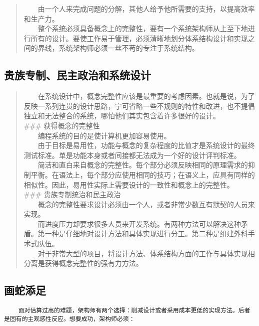 \documentclass[11pt]{article}
\begin{document}
\begin{quote}
  由一个人来完成问题的分解，其他人给予他所需要的支持，以提高效率和生产力。\\
  整个系统必须具备概念上的完整性，要有一个系统架构师从上至下地进行所有的设计。要使工作易于管理，必须清晰地划分体系结构设计和实现之间的界线，系统架构师必须一丝不苟的专注于系统结构。
\end{quote}

\hypertarget{ux8d35ux65cfux4e13ux5236ux6c11ux4e3bux653fux6cbbux548cux7cfbux7edfux8bbeux8ba1}{%
\subsection{贵族专制、民主政治和系统设计}\label{ux8d35ux65cfux4e13ux5236ux6c11ux4e3bux653fux6cbbux548cux7cfbux7edfux8bbeux8ba1}}

\begin{quote}
  在系统设计中，概念完整性应该是最重要的考虑因素。也就是说，为了反映一系列连贯的设计思路，宁可省略一些不规则的特性和改进，也不提倡独立和无法整合的系统，哪怕他们其实包含着许多很好的设计。\\
\#\#\# 获得概念的完整性\\
  编程系统的目的是使计算机更加容易使用。\\
  由于目标是易用性，功能与概念的复杂程度的比值才是系统设计的最终测试标准。单是功能本身或者间接都无法成为一个好的设计评判标准。\\
  简洁和直白来自概念的完整性。每个部分必须反映相同的原理需求的抑制平衡。在语法上，每个部分应使用相同的技巧；在语义上，应具有同样的相似性。因此，易用性实际上需要设计的一致性和概念上的完整性。\\
\#\#\# 贵族专制统治和民主政治\\
  概念的完整性要求设计必须由一个人，或者非常少数互有默契的人员来实现。\\
  而进度压力却要求很多人员来开发系统。有两种方法可以解决这种矛盾。第一种是仔细地对设计方法和具体实现进行分工。第二种是组建外科手术式队伍。\\
  对于非常大型的项目，将设计方法、体系结构方面的工作与具体实现相分离是获得概念完整性的强有力方法。
\end{quote}

\hypertarget{ux753bux86c7ux6dfbux8db3}{%
\subsection{画蛇添足}\label{ux753bux86c7ux6dfbux8db3}}

\begin{verbatim}
    面对估算过高的难题，架构师有两个选择：削减设计或者采用成本更低的实现方法。后者是固有的主观感性反应。想要成功，架构师必须：
\end{verbatim}
\end{document}
